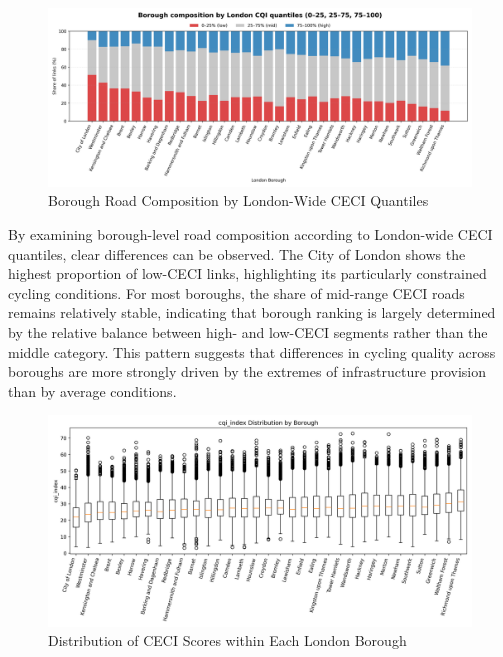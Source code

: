 \documentclass[
  12pt,
  oneside]{book}
\begin{document}
\begin{figure}

{\centering \includegraphics[width=1\linewidth]{general_images/BoroughComposition} 

}

\caption{Borough Road Composition by London-Wide CECI Quantiles}\label{fig:BoroughComposition}
\end{figure}

By examining borough-level road composition according to London-wide CECI quantiles, clear differences can be observed. The City of London shows the highest proportion of low-CECI links, highlighting its particularly constrained cycling conditions. For most boroughs, the share of mid-range CECI roads remains relatively stable, indicating that borough ranking is largely determined by the relative balance between high- and low-CECI segments rather than the middle category. This pattern suggests that differences in cycling quality across boroughs are more strongly driven by the extremes of infrastructure provision than by average conditions.

\begin{figure}

{\centering \includegraphics[width=1\linewidth]{general_images/box_cqi_by_borough} 

}

\caption{Distribution of CECI Scores within Each London Borough}\label{fig:boxcqiborough}
\end{figure}
\end{document}
